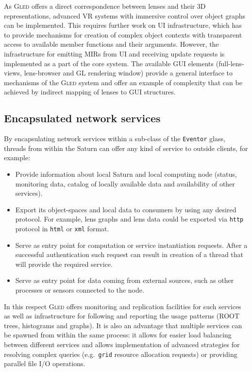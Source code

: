\documentclass[a4paper,11pt]{article}
\def\gled{\textsc{Gled}\xspace}
\def\grid{\texttt{grid}\xspace}
\def\smalltt#1{{\small\texttt{#1}}}
\begin{document}
As \gled offers a direct correspondence between lenses and their 3D
representations, advanced VR systems with immersive control over
object graphs can be implemented. This requires further work on UI
infrastructure, which has to provide mechanisms for creation of
complex object contexts with transparent access to available member
functions and their arguments. However, the infrastructure for
emitting MIRs from UI and receiving update requests is implemented as
a part of the core system. The available GUI elements
(full-lens-views, lens-browser and GL rendering window) provide a
general interface to mechanisms of the \gled system and offer an
example of complexity that can be achieved by indirect mapping of
lenses to GUI structures.

\subsection{Encapsulated network services}

By encapsulating network services with\-in a sub-class of the
\smalltt{Eventor} glass, threads from within the Saturn can offer any
kind of service to outside clients, for example:
\begin{itemize}
\item Provide information about local Saturn and local computing node
  (status, monitoring data, catalog of locally available data and
  availability of other services).
\item Export its object-spaces and local data to consumers by using
  any desired protocol. For example, lens graphs and lens data could
  be exported via \smalltt{http} protocol in \smalltt{html} or
  \smalltt{xml} format.
\item Serve as entry point for computation or service instantiation
  requests. After a successful authentication such request can result
  in creation of a thread that will provide the required service.
\item Serve as entry point for data coming from external sources, such
  as other processes or sensors connected to the node.
\end{itemize}

In this respect \gled offers monitoring and replication facilities for
such services as well as infrastructure for following and reporting
the usage patterns (ROOT trees, histograms and graphs). It is also an
advantage that multiple services can be spawned from within the same
process: it allows for easier load balancing between different
services and allows implementation of advanced strategies for
resolving complex queries (e.g.\ \grid resource allocation requests) or
providing parallel file I/O operations.
\end{document}
